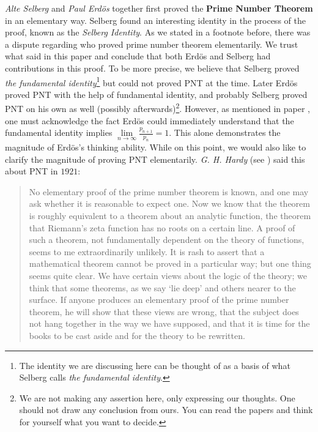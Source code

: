 \documentclass{subfile}
\begin{document}
	\textit{Alte Selberg} and \textit{Paul Erd\" os} together first proved the \textbf{Prime Number Theorem} in an elementary way. Selberg found an interesting identity in the process of the proof, known as the \textit{Selberg Identity}. As we stated in a footnote before, there was a dispute regarding who proved prime number theorem elementarily. We trust what \textcite{goldfeld_2004} said in this paper and conclude that both Erd\" os and Selberg had contributions in this proof. To be more precise, we believe that Selberg proved \textit{the fundamental identity}\footnote{The identity we are discussing here can be thought of as a basis of what Selberg calls \textit{the fundamental identity}.} but could not proved PNT at the time. Later Erd\" os proved PNT with the help of fundamental identity, and probably Selberg proved PNT on his own as well (possibly afterwards)\footnote{We are not making any assertion here, only expressing our thoughts. One should not draw any conclusion from ours. You can read the papers and think for yourself what you want to decide.}. However, as mentioned in paper \textcite[Page $6$]{goldfeld_2004}, one must acknowledge the fact Erd\" os could immediately understand that the fundamental identity implies $\lim\limits_{n\to\infty}\frac{p_{n+1}}{p_n}=1$. This alone demonstrates the magnitude of Erd\" os's thinking ability. While on this point, we would also like to clarify the magnitude of proving PNT elementarily. \textit{G. H. Hardy} (see \textcite[Page $3$]{goldfeld_2004}) said this about PNT in $1921$:
		\begin{quote}
			No elementary proof of the prime number theorem is known, and one may
			ask whether it is reasonable to expect one. Now we know that the theorem
			is roughly equivalent to a theorem about an analytic function, the theorem
			that Riemann's zeta function has no roots on a certain line. A proof of such
			a theorem, not fundamentally dependent on the theory of functions, seems to
			me extraordinarily unlikely. It is rash to assert that a mathematical theorem
			cannot be proved in a particular way; but one thing seems quite clear. We have
			certain views about the logic of the theory; we think that some theorems, as we
			say `lie deep' and others nearer to the surface. If anyone produces an elementary
			proof of the prime number theorem, he will show that these views are wrong,
			that the subject does not hang together in the way we have supposed, and that
			it is time for the books to be cast aside and for the theory to be rewritten.
		\end{quote}
	
\end{document}
